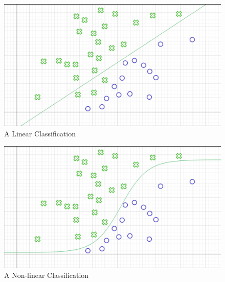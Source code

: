 \begin{figure}[!htb]
    \centering
    \includegraphics[scale=0.2]{Figures/non-linear_classification.png}
    \caption{A Linear Classification}
    \label{fig:linearclassification}
\end{figure}
\begin{figure}[!htb]
    \centering
    \includegraphics[scale=0.2]{Figures/linear_classification.png}
    \caption{A Non-linear Classification}
    \label{fig:nonlinearclassification}
\end{figure}

